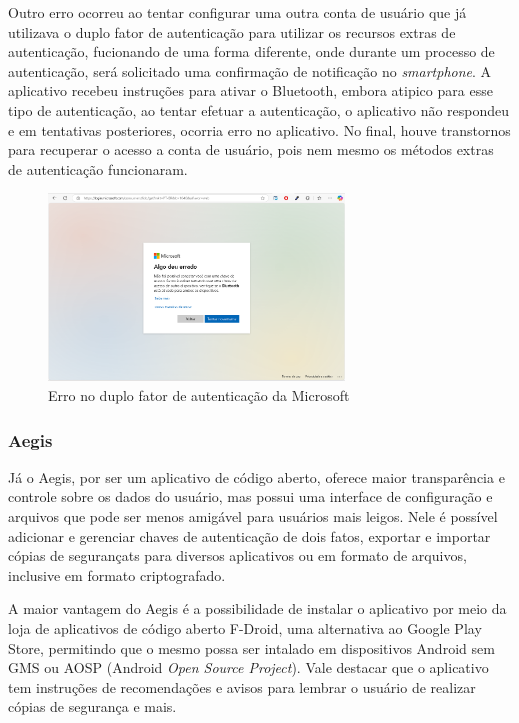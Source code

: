 \documentclass[12pt]{article}
\begin{document}
Outro erro ocorreu ao tentar configurar uma outra conta de usuário que já utilizava o
duplo fator de autenticação para utilizar os recursos extras de autenticação, fucionando
de uma forma diferente, onde durante um processo de autenticação, será solicitado uma
confirmação de notificação no \textit{smartphone}.
A aplicativo recebeu instruções para ativar o Bluetooth, embora atipico para esse tipo
de autenticação, ao tentar efetuar a autenticação, o aplicativo não respondeu e em tentativas
posteriores, ocorria erro no aplicativo.
No final, houve transtornos para recuperar o acesso a conta de usuário, pois nem mesmo os
métodos extras de autenticação funcionaram.

\begin{figure}[h!]
  \centering
  \includegraphics[width=0.7\textwidth]{./assets/microsoft_error_2.png}
  \caption{Erro no duplo fator de autenticação da Microsoft}
  \label{fig:Microsoft2FactoryAutenticatorError}
\end{figure}

\subsubsection{Aegis}

Já o Aegis, por ser um aplicativo de código aberto, oferece maior transparência
e controle sobre os dados do usuário, mas possui uma interface de configuração
e arquivos que pode ser menos amigável para usuários mais leigos.
Nele é possível adicionar e gerenciar chaves de autenticação de dois fatos,
exportar e importar cópias de segurançats para diversos aplicativos ou em formato de arquivos,
inclusive em formato criptografado.

A maior vantagem do Aegis é a possibilidade de instalar o aplicativo por meio da
loja de aplicativos de código aberto F-Droid, uma alternativa ao Google Play
Store, permitindo que o mesmo possa ser intalado em dispositivos Android sem GMS
ou AOSP (Android \textit{Open Source Project}).
Vale destacar que o aplicativo tem instruções de recomendações e avisos para lembrar o usuário
de realizar cópias de segurança e mais.
\end{document}
